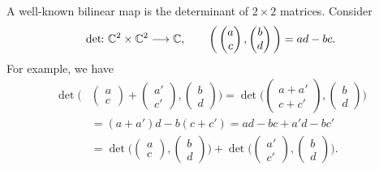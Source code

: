 \documentclass[a4paper, oneside, 12pt]{amsart}
\begin{document}
\begin{example}
  A well-known bilinear map is the determinant of \(2 \times 2\) matrices.
  Consider
  \begin{equation*}
    \det \from \mathbb{C}^{2} \times \mathbb{C}^{2} \to \mathbb{C}, \qquad \bigg(
    \begin{pmatrix}
      a \\ c
    \end{pmatrix},
    \begin{pmatrix}
      b \\ d
    \end{pmatrix}
    \bigg)
    = ad - bc.
  \end{equation*}
  For example, we have
  \begin{align*}
    \det \bigg(
    &
      \begin{pmatrix}
        a \\ c
      \end{pmatrix}
      +
      \begin{pmatrix}
        a' \\ c'
      \end{pmatrix},
      \begin{pmatrix}
        b \\ d
      \end{pmatrix}
      \bigg)
      =
      \det \bigg(
      \begin{pmatrix}
        a + a'  \\ c + c'
      \end{pmatrix},
      \begin{pmatrix}
        b \\ d
      \end{pmatrix}
      \bigg)\\
    & = (a+ a')d - b(c + c') = ad - bc + a'd - bc' \\
    & =
      \det \bigg(
      \begin{pmatrix}
        a \\ c
      \end{pmatrix},
      \begin{pmatrix}
        b \\ d
      \end{pmatrix}\bigg)
      +
      \det \bigg(
      \begin{pmatrix}
        a' \\ c'
      \end{pmatrix},
      \begin{pmatrix}
        b \\ d
      \end{pmatrix}\bigg).
  \end{align*}
\end{example}
\end{document}
